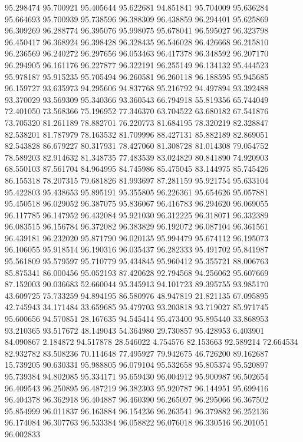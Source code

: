 95.298474
95.700921
95.405644
95.622681
94.851841
95.704009
95.636284
95.664693
95.700939
95.738596
96.388309
96.438859
96.294401
95.625869
96.309269
96.288774
96.395076
95.998075
95.678041
96.595027
96.323798
96.450417
96.368924
96.398428
96.328435
96.546028
96.426668
96.215810
96.236569
96.240272
96.297656
96.053463
96.417378
96.348592
96.207170
96.294905
96.161176
96.227877
96.322191
96.255149
96.134132
95.444523
95.978187
95.915235
95.705494
96.260581
96.260118
96.188595
95.945685
96.159727
93.635973
94.295606
94.837768
95.216792
94.497894
93.392488
93.370029
93.569309
95.340366
93.360543
66.794918
55.819356
65.744049
72.401050
73.568366
75.196952
77.346370
63.704522
63.680182
67.541876
73.705320
81.261189
78.882701
76.220773
81.684195
78.320219
82.328847
82.538201
81.787979
78.163532
81.709996
88.427131
85.882189
82.869051
82.543828
86.679227
80.317931
78.427060
81.308728
81.014308
79.054752
78.589203
82.914632
81.348735
77.483539
83.024829
80.841890
74.920903
68.550103
87.561704
84.964995
84.745986
85.475045
83.144975
85.745426
86.155318
78.207315
79.681826
81.993697
87.281159
95.921754
95.633104
95.422803
95.438653
95.895191
95.355805
96.226361
95.654626
95.057881
95.450518
96.029052
96.387075
95.836067
96.416783
96.294620
96.069055
96.117785
96.147952
96.432084
95.921030
96.312225
96.318071
96.332389
96.083515
96.156784
96.372082
96.383829
96.192072
96.087104
96.361561
96.439181
96.232020
95.871790
96.020135
95.994479
95.674112
96.195073
96.106055
95.918514
96.190316
96.035437
96.282333
95.491702
95.841987
95.561809
95.579597
95.710779
95.434845
95.960412
95.355721
88.006763
85.875341
86.000456
95.052193
87.420628
92.794568
94.256062
95.607669
87.152003
90.036683
52.660044
95.345913
94.101723
89.395755
93.985170
43.609725
75.733259
94.894195
86.580976
48.947819
21.821135
67.095895
42.745943
34.171484
33.659685
95.479703
93.203818
93.719027
85.971745
95.600656
94.570851
28.167635
94.545414
95.473400
95.895440
33.868953
93.210365
93.517672
48.149043
54.364980
29.730857
95.428953
6.403901
84.090867
2.184872
94.517878
28.546022
4.754576
82.153663
92.589214
72.664534
82.932782
83.508236
70.114648
77.495927
79.942675
46.726200
89.162687
15.739205
90.630331
95.988805
96.079104
95.532658
95.805374
95.520897
95.739384
94.802085
95.334171
95.659430
96.004912
95.900987
96.502654
96.409543
96.250895
96.487219
96.382303
95.920787
96.144951
95.699416
96.404378
96.362918
96.404887
96.460390
96.265097
96.295066
96.367502
95.854999
96.011837
96.163884
96.154236
96.263541
96.379882
96.252136
96.174084
96.307763
96.533384
96.058822
96.076018
96.330516
96.201051
96.002833
